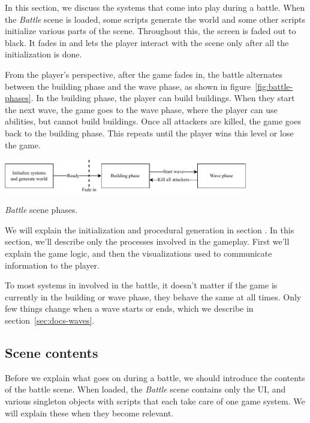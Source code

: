 In this section, we discuss the systems that come into play during a battle.
When the \emph{Battle} scene is loaded, some scripts generate the world and some other scripts initialize various parts of the scene.
Throughout this, the screen is faded out to black.
It fades in and lets the player interact with the scene only after all the initialization is done.

From the player's perspective, after the game fades in, the battle alternates between the building phase and the wave phase, as shown in figure~\ref{fig:battle-phases}.
In the building phase, the player can build buildings.
When they start the next wave, the game goes to the wave phase, where the player can use abilities, but cannot build buildings.
Once all attackers are killed, the game goes back to the building phase.
This repeats until the player wins this level or lose the game.

\begin{center}
    \captionsetup{type=figure}
    \includegraphics[width=0.8\textwidth]{img/battle scene phases.pdf}
    \caption{\emph{Battle} scene phases.}
    \label{fig:battle-phases}
\end{center}

We will explain the initialization and procedural generation in section .
In this section, we'll describe only the processes involved in the gameplay.
First we'll explain the game logic, and then the visualizations used to communicate information to the player.

To most systems in involved in the battle, it doesn't matter if the game is currently in the building or wave phase, they behave the same at all times.
Only few things change when a wave starts or ends, which we describe in section~\ref{sec:docs-waves}.

\subsection{Scene contents}

Before we explain what goes on during a battle, we should introduce the contents of the battle scene.
When loaded, the \emph{Battle} scene contains only the UI, and various singleton objects with scripts that each take care of one game system.
We will explain these when they become relevant.

